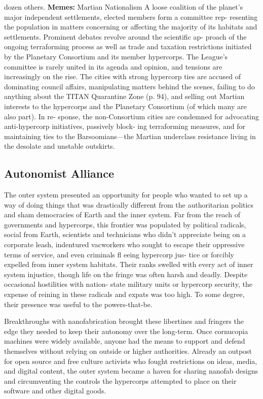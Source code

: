dozen others.
\textbf{Memes:} Martian Nationalism
A loose coalition of the planet's major independent 
settlements, elected members form a committee rep-
resenting the population in matters concerning or 
affecting the majority of its habitats and settlements. 
Prominent debates revolve around the scientific ap-
proach of the ongoing terraforming process as well 
as trade and taxation restrictions initiated by the 
Planetary Consortium and its member hypercorps. 
The League's committee is rarely united in its agenda 
and opinion, and tensions are increasingly on the rise. 
The cities with strong hypercorp ties are accused of 
dominating council affairs, manipulating matters 
behind the scenes, failing to do anything about the 
TITAN Quarantine Zone (p. 94), and selling out 
Martian interests to the hypercorps and the Planetary 
Consortium (of which many are also part). In re-
sponse, the non-Consortium cities are condemned for 
advocating anti-hypercorp initiatives, passively block-
ing terraforming measures, and for maintaining ties to 
the Barsoomians—the Martian underclass resistance 
living in the desolate and unstable outskirts.

\subsection{Autonomist Alliance}

The outer system presented an opportunity for people 
who wanted to set up a way of doing things that was 
drastically different from the authoritarian politics 
and sham democracies of Earth and the inner system. 
Far from the reach of governments and hypercorps, 
this frontier was populated by political radicals, social 
from Earth, scientists and technicians who 
didn't appreciate being on a corporate 
leash, indentured vacworkers who sought 
to escape their oppressive terms of service, 
and even criminals fl eeing hypercorp jus-
tice or forcibly expelled from inner system 
habitats. Their ranks swelled with every 
act of inner system injustice, though life 
on the fringe was often harsh and deadly. 
Despite occasional hostilities with nation-
state military units or hypercorp security, 
the expense of reining in these radicals and 
expats was too high. To some degree, their 
presence was useful to the powers-that-be.

Breakthroughs with nanofabrication 
brought these libertines and fringers the 
edge they needed to keep their autonomy 
over the long-term. Once cornucopia 
machines were widely available, anyone 
had the means to support and defend 
themselves without relying on outside or 
higher authorities. Already an outpost for 
open source and free culture activists who 
fought restrictions on ideas, media, and 
digital content, the outer system became 
a haven for sharing nanofab designs and 
circumventing the controls the hypercorps 
attempted to place on their software and 
other digital goods.

